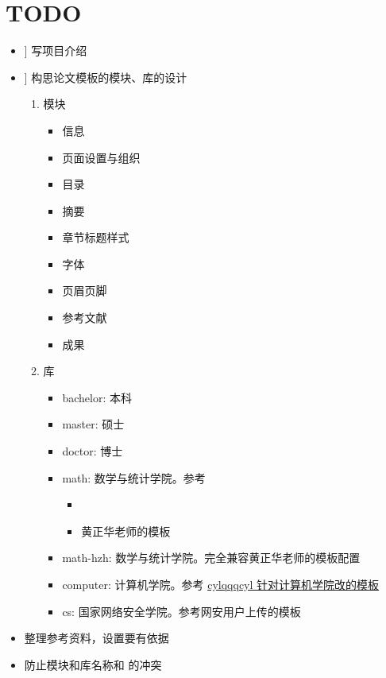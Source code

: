 

\chapter{TODO}

\newcommand\Done{\faCheckSquare[regular]} %
\newcommand\HalfDone{\faMinusSquare[regular]} %
\newcommand\NotDone{\faSquare[regular]} %
\newcommand\ToBeSpecified{\faPlusSquare[regular]} %

\goodbreak
\begin{itemize}[midpenalty=-1000,
  label=\protect\raisebox{-.3ex}{\NotDone}]
  \item[\Done] 写项目介绍
  \item[\ToBeSpecified] 构思论文模板的模块、库的设计
    \begin{enumerate}
      \item 模块
        \begin{itemize}[midpenalty=-1000,
          label=\protect\raisebox{-.3ex}{\NotDone}]
          \item 信息
          \item 页面设置与组织
          \item 目录
          \item 摘要
          \item 章节标题样式
          \item 字体
          \item 页眉页脚
          \item 参考文献
          \item 成果
        \end{itemize}
      \item 库
        \begin{itemize}[midpenalty=-1000,
          label=\protect\raisebox{-.3ex}{\NotDone}]
          \item bachelor: 本科
          \item master: 硕士
          \item doctor: 博士
          \item math: 数学与统计学院。参考
            \begin{itemize}
              \item {}
              \item 黄正华老师的模板
            \end{itemize}
          \item math-hzh: 数学与统计学院。完全兼容黄正华老师的模板配置
          \item computer: 计算机学院。参考 \href{https://github.com/cylqqqcyl/whu-thesis-2024}{cylqqqcyl 针对计算机学院改的模板}
          \item cs: 国家网络安全学院。参考网安用户上传的模板
        \end{itemize}
    \end{enumerate}
  \item 整理参考资料，设置要有依据
  \item 防止模块和库名称和 \CusTeX 的冲突
\end{itemize}